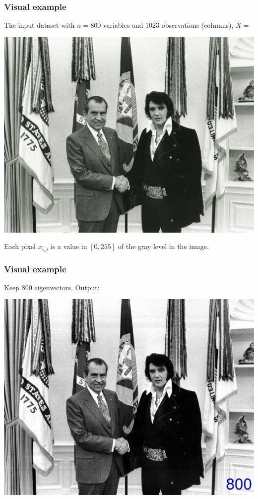\documentclass[serif, 12pt]{beamer}
\begin{document}
\begin{frame}

\frametitle{Visual example}

The input dataset with $n=800$ variables and 1023 observations (columns), $X =$

\begin{center}
\includegraphics[scale=0.2]{input}
\end{center}

Each pixel $x_{i,j}$ is a value in $[0, 255]$ of the gray level in the image.  

\end{frame}


\begin{frame}

\frametitle{Visual example}
Keep 800 eigenvectors. Output:

\begin{center}
\includegraphics[width=\textheight]{out-800}
\end{center}

\end{frame}
\end{document}
